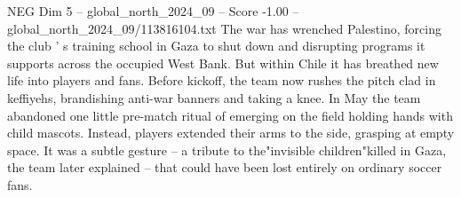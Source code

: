\begin{textsample}{NEG Dim 5 – global\_north\_2024\_09 – Score -1.00 – global\_north\_2024\_09/113816104.txt}
The war has wrenched Palestino, forcing the club ' s training school in Gaza to shut down and disrupting programs it supports across the occupied West Bank.
But within Chile it has breathed new life into players and fans.
Before kickoff, the team now rushes the pitch clad in keffiyehs, brandishing anti-war banners and taking a knee.
In May the team abandoned one little pre-match ritual of emerging on the field holding hands with child mascots.
Instead, players extended their arms to the side, grasping at empty space.
It was a subtle gesture -- a tribute to the"invisible children"killed in Gaza, the team later explained -- that could have been lost entirely on ordinary soccer fans.

\end{textsample}
